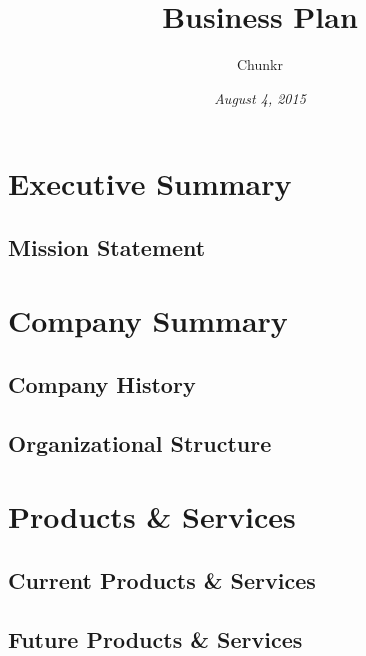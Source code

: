 \documentclass[titlepage]{article}
\begin{document}
\title{\Huge \textbf{Business Plan}}
\date{\emph{August 4, 2015}}
\author{\Large Chunkr}
\maketitle

\tableofcontents

\section{Executive Summary}


\subsection{Mission Statement}

\section{Company Summary}
\subsection{Company History}
\subsection{Organizational Structure}


\section{Products \& Services}
\subsection{Current Products \& Services}
\subsection{Future Products \& Services}
\end{document}

